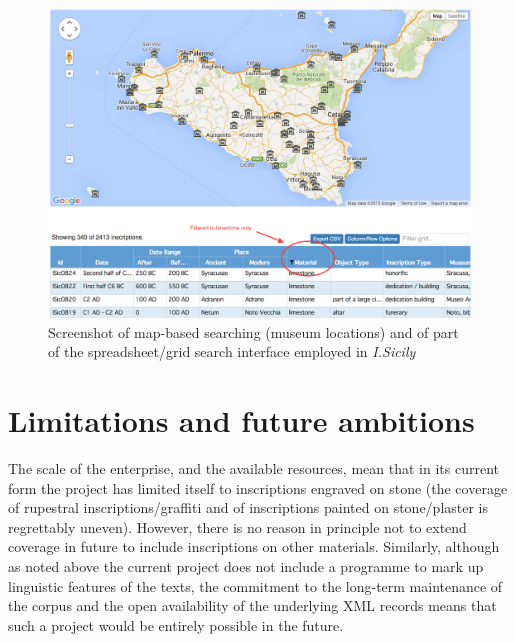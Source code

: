 \documentclass[amsthm,ebook]{saparticle}
\begin{document}
\begin{figure}[!bp]
\centering
 \includegraphics[width=\columnwidth]{EAGLE2016ISicilyfinalcopy-img002.png}
\caption{Screenshot of map-based searching (museum locations) and of part of the spreadsheet/grid search interface
employed in \emph{I.Sicily}}
\label{fig:2}
\end{figure}
 



\section{Limitations and future ambitions}


\noindent The scale of the enterprise, and the available resources, mean that in its current form the project has limited itself
to inscriptions engraved on stone (the coverage of rupestral inscriptions/graffiti and of inscriptions painted on
stone/plaster is regrettably uneven). However, there is no reason in principle not to extend coverage in future to
include inscriptions on other materials. Similarly, although as noted above the current project does not include a
programme to mark up linguistic features of the texts, the commitment to the long-term maintenance of the corpus and
the open availability of the underlying XML records means that such a project would be entirely possible in the future.
\end{document}
